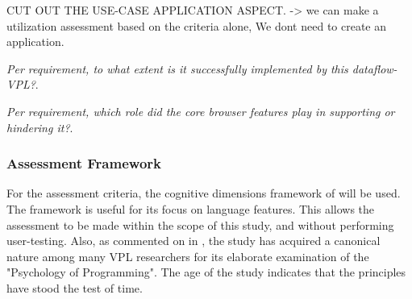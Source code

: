\begin{note}
  CUT OUT THE USE-CASE APPLICATION ASPECT. 
  -> we can make a utilization assessment based on the criteria alone, We dont need to create an application.

\item \emph{Per requirement, to what extent is it successfully implemented by this dataflow-VPL?}.
  \item \emph{Per requirement, which role did the core browser features play in supporting or hindering it?}.

\end{note}


\subsubsection{Assessment Framework}
For the assessment criteria, the cognitive dimensions framework of \cite[]{green_usability_1996} will be used. 
The framework is useful for its focus on language features. 
This allows the assessment to be made within the scope of this study, and without performing user-testing.
Also, as commented on in , the study has acquired a canonical nature among many VPL researchers for its elaborate examination of the "Psychology of Programming".
The age of the study indicates that the principles have stood the test of time. 

